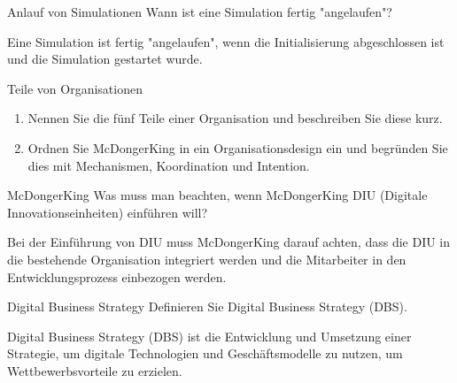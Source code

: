 \documentclass{article}
\begin{document}
\begin{exercise}{Anlauf von Simulationen}
  Wann ist eine Simulation fertig "angelaufen"?

  \begin{solution}
    Eine Simulation ist fertig "angelaufen", wenn die Initialisierung abgeschlossen ist und die Simulation gestartet wurde.
  \end{solution}
\end{exercise}

\begin{exercise}{Teile von Organisationen}
  \begin{enumerate}
    \item Nennen Sie die fünf Teile einer Organisation und beschreiben Sie diese kurz.
          \begin{solution}
          \end{solution}
    \item Ordnen Sie McDongerKing in ein Organisationsdesign ein und begründen Sie dies mit Mechanismen, Koordination und Intention.
          \begin{solution}
          \end{solution}
  \end{enumerate}
\end{exercise}

\begin{exercise}{McDongerKing}
  Was muss man beachten, wenn McDongerKing DIU (Digitale Innovationseinheiten) einführen will?

  \begin{solution}
    Bei der Einführung von DIU muss McDongerKing darauf achten, dass die DIU in die bestehende Organisation integriert werden und die Mitarbeiter in den Entwicklungsprozess einbezogen werden.
  \end{solution}
\end{exercise}

\begin{exercise}{Digital Business Strategy}
  Definieren Sie Digital Business Strategy (DBS).

  \begin{solution}
    Digital Business Strategy (DBS) ist die Entwicklung und Umsetzung einer Strategie, um digitale Technologien und Geschäftsmodelle zu nutzen, um Wettbewerbsvorteile zu erzielen.
  \end{solution}
\end{exercise}
\end{document}
